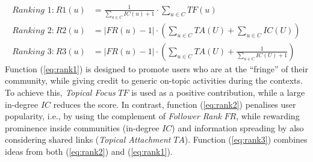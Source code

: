 \begin{align}
\textit{Ranking 1:} ~ \mathit{R1}(u) & = \frac{1}{\sum_{u \in C} \mathit{IC}(u) + 1} \cdot \sum_{u \in C} \mathit{TF}(u) \label{eq:rank1} \\
\textit{Ranking 2:} ~ \mathit{R2}(u) & = \lvert \mathit{FR}(u) - 1 \rvert \cdot \left(\sum_{u \in C} \mathit{TA}(U) + \sum_{u \in C} \mathit{IC}(U)\right) \label{eq:rank2} \\
\textit{Ranking 3:} ~ \mathit{R3}(u) & = \lvert \mathit{FR}(u) - 1 \rvert \cdot \left(\sum_{u \in C} \mathit{TA}(U) + \frac{1}{\sum_{u \in C} \mathit{IC}(U) + 1}\right) \label{eq:rank3}
\end{align}
%
Function (\ref{eq:rank1}) is designed to promote users who are at the ``fringe'' of their community, while giving credit to generic on-topic activities during the contexts. 
To achieve this, \textit{Topical Focus} $\mathit{TF}$ is used as a positive contribution, while a large in-degree $\mathit{IC}$ reduces the score.
%
In contrast, function (\ref{eq:rank2}) penalises user popularity, i.e., by using the complement of \textit{Follower Rank} $\mathit{FR}$, while rewarding prominence inside communities (in-degree $\mathit{IC}$) and information spreading by also considering shared links (\textit{Topical Attachment} $\mathit{TA}$).
%
Function (\ref{eq:rank3}) combines ideas from both (\ref{eq:rank2}) and (\ref{eq:rank1}).

